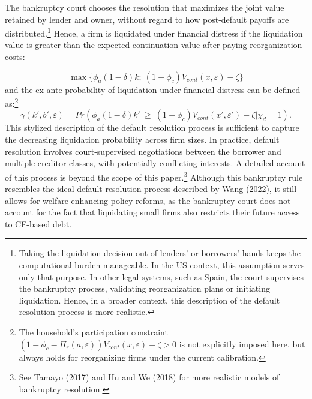 \documentclass[12pt]{article}
\begin{document}
The bankruptcy court chooses the resolution that maximizes the joint value retained by lender and owner, without regard to how post-default payoffs are distributed.\footnote{Taking the liquidation decision out of lenders' or borrowers' hands keeps the computational burden manageable. In the US context, this assumption serves only that purpose. In other legal systems, such as Spain, the court supervises the bankruptcy process, validating reorganization plans or initiating liquidation. Hence, in a broader context, this description of the default resolution process is more realistic.} Hence, a firm is liquidated under financial distress if the liquidation value is greater than the expected continuation value after paying reorganization costs:

\begin{equation} \label{eq:liquidation decision}
 \max \{ \phi_a (1-\delta) k; \ (1-\phi_c) V_{cont}(x,\varepsilon)- \zeta\}
\end{equation}
and the ex-ante probability of liquidation under financial distress can be defined as:\footnote{The household's participation constraint $(1-\phi_c-\Pi_r(a,\varepsilon))V_{cont}(x,\varepsilon) - \zeta > 0$ is not explicitly imposed here, but always holds for reorganizing firms under the current calibration.} 
\begin{equation} \label{eq:liquidation probability}
    \gamma(k', b', \varepsilon) = Pr(\phi_a (1-\delta) k' \ \geq \ (1-\phi_c) V_{cont}(x',\varepsilon') - \zeta | \chi_d = 1).
\end{equation} 
This stylized description of the default resolution process is sufficient to capture the decreasing liquidation probability across firm sizes. In practice, default resolution involves court-supervised negotiations between the borrower and multiple creditor classes, with potentially conflicting interests. A detailed account of this process is beyond the scope of this paper.\footnote{See Tamayo (2017) and Hu and We (2018) for more realistic models of bankruptcy resolution.} Although this bankruptcy rule resembles the ideal default resolution process described by Wang (2022), it still allows for welfare-enhancing policy reforms, as the bankruptcy court does not account for the fact that liquidating small firms also restricts their future access to CF-based debt.
\end{document}
